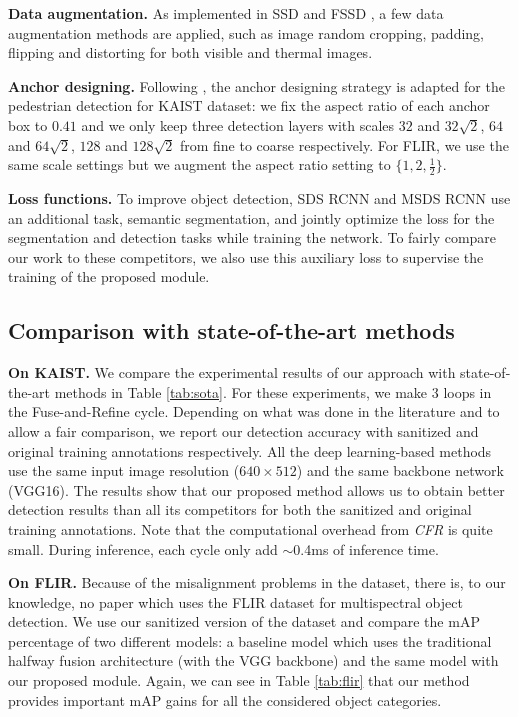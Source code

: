 \documentclass{article}
\begin{document}
\noindent
\textbf{Data augmentation.} As implemented in SSD \cite{SSD} and FSSD \cite{FSSD}, a few data augmentation methods are applied, such as image random cropping, padding, flipping and distorting for both visible and thermal images. 

\noindent
\textbf{Anchor designing.} Following \cite{fourone}, the anchor designing strategy is adapted for the pedestrian detection for KAIST dataset: we fix the aspect ratio of each anchor box to $0.41$ and we only keep three detection layers with scales $32$ and $32\sqrt{2}$, $64$ and $64\sqrt{2}$, $128$ and $128\sqrt{2}$ from fine to coarse respectively. For FLIR, we use the same scale settings but we augment the aspect ratio setting to $\{1,2,\frac{1}{2}\}$.

\noindent
\textbf{Loss functions.} To improve object detection, SDS RCNN \cite{SDS} and MSDS RCNN \cite{MSDS} use an additional task, semantic segmentation, and jointly optimize the loss for the segmentation and detection tasks while training the network. To fairly compare our work to these competitors, we also use this auxiliary loss to supervise the training of the proposed module.

\subsection{Comparison with state-of-the-art methods}

\textbf{On KAIST.} We compare the experimental results of our approach with state-of-the-art methods in Table \ref{tab:sota}.
For these experiments, we make 3 loops in the Fuse-and-Refine cycle. Depending on what was done in the literature and to allow a fair comparison, we report our detection accuracy with sanitized and original training annotations respectively. 
All the deep learning-based methods \cite{TestAnno,RPNM,Illumination-aware-li,Illumination-aware-guan,MSDS} use the same input image resolution ($640\times512$) and the same backbone network (VGG16). The results show that our proposed method allows us to obtain better detection results than all its competitors for both the sanitized and original training annotations.
Note that the computational overhead from \textit{CFR} is quite small. During inference, each cycle only add $\sim$0.4ms of inference time. 

\noindent
\textbf{On FLIR.} Because of the misalignment problems in the dataset, there is, to our knowledge, no paper which uses the FLIR dataset \cite{Flir} for multispectral object detection. We use our sanitized version of the dataset and compare the mAP percentage of two different models: a baseline model which uses the traditional halfway fusion architecture (with the VGG backbone) and the same model with our proposed module. Again, we can see in Table \ref{tab:flir} that our method provides important mAP gains for all the considered object categories.
\end{document}
